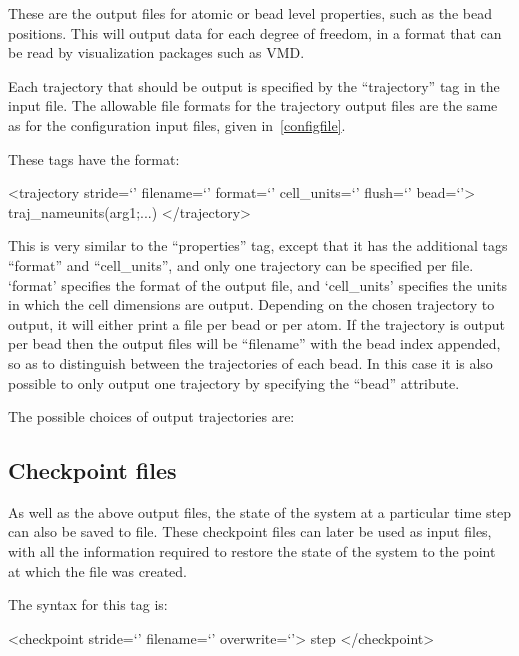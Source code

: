 \documentclass[11pt,english,fleqn]{report}
\newenvironment{code}{%
\footnotesize 
\verbatim
}{
\endverbatim
\normalsize
}
\begin{document}
These are the output files for atomic or bead level properties, such
as the bead positions. This will output data for each degree of
freedom, in a format that can be read by visualization packages
such as VMD.

Each trajectory that should be output is specified
by the {}``trajectory'' tag in the input file. The allowable file
formats for the trajectory output files are the same as for the configuration
input files, given in~\ref{configfile}.

These tags have the format:

\begin{code}
<trajectory stride=`' filename=`' format=`' cell_units=`' flush=`' bead=`'>
   traj_name{units}(arg1;...)
</trajectory>
\end{code}

This is very similar to the {}``properties'' tag, except that it has the
additional tags {}``format'' and {}``cell\_units'', and only one
trajectory can be specified per file. `format' specifies the format
of the output file, and `cell\_units' specifies the units in which
the cell dimensions are output. Depending on the chosen trajectory
to output, it will either print a file per bead or per atom. If the
trajectory is output per bead then the output files will be {}``filename''
with the bead index appended, so as to distinguish between the trajectories
of each bead. In this case it is also possible to only output one
trajectory by specifying the {}``bead'' attribute. 

The possible choices of output trajectories are:




\subsection{Checkpoint files}

\label{checkpoint}

As well as the above output files, the state of the system at a particular
time step can also be saved to file. These checkpoint files can later be
used as input files, with all the information required to restore
the state of the system to the point at which the file was created. 

The syntax for this tag is:

\begin{code}<checkpoint stride=`' filename=`' overwrite=`'>
   step
</checkpoint>\end{code}
\end{document}

